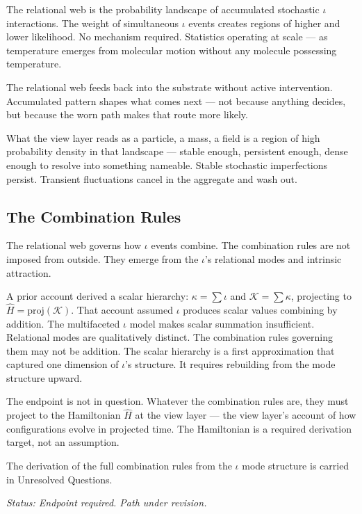 \documentclass[11pt,letterpaper]{article}
\newcommand{\Kappa}{\mathcal{K}}
\begin{document}
The relational web is the probability landscape of accumulated stochastic \(\iota\) interactions. The weight of simultaneous \(\iota\) events creates regions of higher and lower likelihood. No mechanism required. Statistics operating at scale --- as temperature emerges from molecular motion without any molecule possessing temperature.

The relational web feeds back into the substrate without active intervention. Accumulated pattern shapes what comes next --- not because anything decides, but because the worn path makes that route more likely.

What the view layer reads as a particle, a mass, a field is a region of high probability density in that landscape --- stable enough, persistent enough, dense enough to resolve into something nameable. Stable stochastic imperfections persist. Transient fluctuations cancel in the aggregate and wash out.

\subsection{The Combination Rules}
\label{sec:org570c333}

The relational web governs how \(\iota\) events combine. The combination rules are not imposed from outside. They emerge from the \(\iota\)'s relational modes and intrinsic attraction.

A prior account derived a scalar hierarchy: \(\kappa = \sum \iota\) and \(\Kappa = \sum \kappa\), projecting to \(\hat{H} = \mathrm{proj}(\Kappa)\). That account assumed \(\iota\) produces scalar values combining by addition. The multifaceted \(\iota\) model makes scalar summation insufficient. Relational modes are qualitatively distinct. The combination rules governing them may not be addition. The scalar hierarchy is a first approximation that captured one dimension of \(\iota\)'s structure. It requires rebuilding from the mode structure upward.

The endpoint is not in question. Whatever the combination rules are, they must project to the Hamiltonian \(\hat{H}\) at the view layer --- the view layer's account of how configurations evolve in projected time. The Hamiltonian is a required derivation target, not an assumption.

The derivation of the full combination rules from the \(\iota\) mode structure is carried in Unresolved Questions.

\emph{Status: Endpoint required. Path under revision.}
\end{document}
